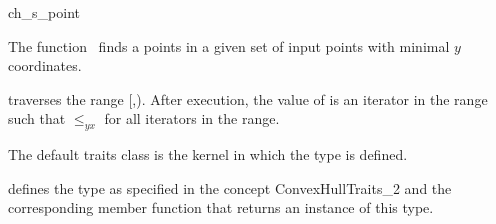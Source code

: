 

\begin{ccRefFunction}{ch_s_point}  %

\ccDefinition
  
The function \ccRefName\ finds a points in a given set  
of input points with minimal $y$ coordinates.


           {traverses the range [,).
            After execution, the value of
             is an iterator in the range such that  $\le_{yx}$
             for all iterators  in the range.}


The default traits class  is the kernel in which the
type  is defined.

 defines the type  as specified in
the concept ConvexHullTraits\_2 and the corresponding member
function that returns an instance of this type.


\ccSeeAlso

 \\
 \\
 \\
 \\
 \\

\end{ccRefFunction}



